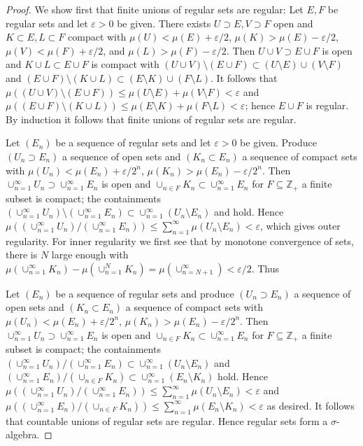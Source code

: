 \documentclass[11pt]{article}
\begin{document}
\begin{enumerate}
\begin{proof}
        We show first that finite unions of regular sets are regular: Let $E, F$ be regular sets and let $\varepsilon>0$ be given. There exists $U\supset E,V\supset F$ open and $K\subset E,L\subset F$ compact with $\mu(U)<\mu(E) + \varepsilon/2$, $\mu(K)>\mu(E)-\varepsilon/2$, $\mu(V)<\mu(F) + \varepsilon/2$, and $\mu(L)>\mu(F)-\varepsilon/2$. Then $U\cup V\supset E\cup F$ is open and $K\cup L\subset E\cup F$ is compact with $(U\cup V)\setminus(E\cup F)\subset (U\setminus E)\cup (V\setminus F)$ and $(E\cup F)\setminus(K\cup L)\subset (E\setminus K)\cup (F\setminus L)$. It follows that $\mu( (U\cup V)\setminus(E\cup F)) \leq \mu( U\setminus E) + \mu(V\setminus F) < \varepsilon$ and $\mu((E\cup F)\setminus(K\cup L))\leq \mu(E\setminus K) + \mu(F\setminus L) < \varepsilon$; hence $E\cup F$ is regular. By induction it follows that finite unions of regular sets are regular.

        Let $(E_n)$ be a sequence of regular sets and let $\varepsilon>0$ be given. Produce $(U_n\supset E_n)$ a sequence of open sets and $(K_n\subset E_n)$ a sequence of compact sets with $\mu(U_n)<\mu(E_n) + \varepsilon/2^n$, $\mu(K_n)>\mu(E_n)-\varepsilon/2^n$. Then $\cup_{n=1}^\infty U_n \supset \cup_{n=1}^\infty E_n$ is open and $\cup_{n\in F} K_n\subset \cup_{n=1}^\infty E_n$ for $F\subseteq \mathbb{Z}_+$ a finite subset is compact; the containments $(\cup_{n=1}^\infty U_n)\setminus(\cup_{n=1}^\infty E_n)\subset \cup_{n=1}^\infty (U_n\setminus E_n)$ and 
        hold. Hence $\mu((\cup_{n=1}^\infty U_n)/(\cup_{n=1}^\infty E_n))\leq \sum_{n=1}^\infty \mu(U_n\setminus E_n) < \varepsilon$, which gives outer regularity. For inner regularity we first see that by monotone convergence of sets, there is $N$ large enough with $\mu(\cup_{n=1}^\infty K_n) - \mu(\cup_{n=1}^NK_n) = \mu(\cup_{n=N+1}^\infty) < \varepsilon/2$. Thus 

        Let $(E_n)$ be a sequence of regular sets and produce $(U_n\supset E_n)$ a sequence of open sets and $(K_n\subset E_n)$ a sequence of compact sets with $\mu(U_n)<\mu(E_n) + \varepsilon/2^n$, $\mu(K_n)>\mu(E_n)-\varepsilon/2^n$. Then $\cup_{n=1}^\infty U_n \supset \cup_{n=1}^\infty E_n$ is open and $\cup_{n\in F} K_n\subset \cup_{n=1}^\infty E_n$ for $F\subseteq \mathbb{Z}_+$ a finite subset is compact; the containments $(\cup_{n=1}^\infty U_n)/(\cup_{n=1}^\infty E_n)\subset \cup_{n=1}^\infty (U_n\setminus E_n)$ and $(\cup_{n=1}^\infty E_n)/(\cup_{n\in F} K_n)\subset \cup_{n=1}^\infty (E_n\setminus K_n)$ hold. Hence $\mu((\cup_{n=1}^\infty U_n)/(\cup_{n=1}^\infty E_n))\leq \sum_{n=1}^\infty \mu(U_n\setminus E_n) < \varepsilon$ and $\mu((\cup_{n=1}^\infty E_n)/(\cup_{n\in F} K_n))\leq \sum_{n=1}^\infty \mu(E_n\setminus K_n) < \varepsilon$ as desired. It follows that countable unions of regular sets are regular. Hence regular sets form a $\sigma$-algebra.


\end{proof}
\end{enumerate}
\end{document}
